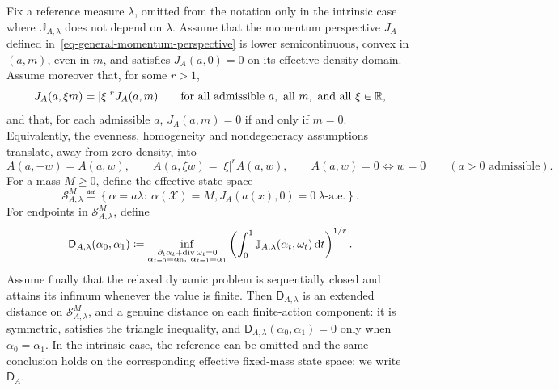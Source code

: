 \begin{prop}\label{prop-homogeneous-dynamic-action-distance}
	Fix a reference measure \(\lambda\), omitted from the notation only in the intrinsic case where \(\mathbb J_{A,\lambda}\) does not depend on \(\lambda\). Assume that the momentum perspective \(J_A\) defined in~\eqref{eq-general-momentum-perspective} is lower semicontinuous, convex in \((a,m)\), even in \(m\), and satisfies \(J_A(a,0)=0\) on its effective density domain. Assume moreover that, for some \(r>1\),
	\[
			J_A(a,\xi m)=|\xi|^rJ_A(a,m)
			\qquad
			\text{for all admissible }a,\ \text{all }m,\ \text{and all }\xi\in\mathbb{R},
	\]
	and that, for each admissible $a$, \(J_A(a,m)=0\) if and only if \(m=0\). Equivalently, the evenness, homogeneity and nondegeneracy assumptions translate, away from zero density, into
	\[
		A(a,-w)=A(a,w),
		\qquad
		A(a,\xi w)=|\xi|^rA(a,w),
		\qquad
		A(a,w)=0 \Longleftrightarrow w=0
		\qquad (a>0\text{ admissible}).
	\]
	For a mass $M\geq0$, define the effective state space
	\[
		\mathcal S_{A,\lambda}^M
		\eqdef
		\left\{\alpha=a\lambda:\ \alpha(\mathcal X)=M,
		J_A(a(x),0)=0\ \lambda\text{-a.e.}\right\}.
	\]
	For endpoints in $\mathcal S_{A,\lambda}^M$, define
	\[
		\mathsf D_{A,\lambda}(\alpha_0,\alpha_1)
		\coloneqq
		\inf_{\substack{\partial_t\alpha_t+\operatorname{div}\omega_t=0\\
		\alpha_{t=0}=\alpha_0,\ \alpha_{t=1}=\alpha_1}}
		\left(
		\int_0^1\mathbb J_{A,\lambda}(\alpha_t,\omega_t)\,\mathrm{d} t
		\right)^{1/r}.
	\]
	Assume finally that the relaxed dynamic problem is sequentially closed and attains its infimum whenever the value is finite. Then \(\mathsf D_{A,\lambda}\) is an extended distance on $\mathcal S_{A,\lambda}^M$, and a genuine distance on each finite-action component: it is symmetric, satisfies the triangle inequality, and \(\mathsf D_{A,\lambda}(\alpha_0,\alpha_1)=0\) only when \(\alpha_0=\alpha_1\). In the intrinsic case, the reference can be omitted and the same conclusion holds on the corresponding effective fixed-mass state space; we write \(\mathsf D_A\).
\end{prop}

